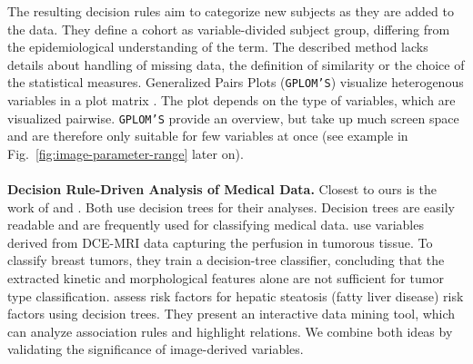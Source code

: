 \documentclass[a4paper,twoside]{style/article}
\begin{document}
The resulting decision rules aim to categorize new subjects as they are added to the data.
They define a cohort as variable-divided subject group, differing from the epidemiological understanding of the term.
The described method lacks details about handling of missing data, the definition of similarity or the choice of the statistical measures.
Generalized Pairs Plots (\texttt{GPLOM'S}) visualize heterogenous variables in a plot matrix \cite{GPLOMS}. %
The plot depends on the type of variables, which are visualized pairwise.
\texttt{GPLOM'S} provide an overview, but take up much screen space and are therefore only suitable for few variables at once (see example in Fig.~\ref{fig:image-parameter-range} later on).
\\\\
\noindent \textbf{Decision Rule-Driven Analysis of Medical Data.}
Closest to ours is the work of \cite{Glasser2013} and \cite{Niemann2014}.
Both use decision trees for their analyses.
Decision trees are easily readable and are frequently used for classifying medical data.
\cite{Glasser2013} use variables derived from DCE-MRI data capturing the perfusion in tumorous tissue.
To classify breast tumors, they train a decision-tree classifier, concluding that the extracted kinetic and morphological features alone are not sufficient for tumor type classification.
\cite{Niemann2014} assess risk factors for hepatic steatosis (fatty liver disease) risk factors using decision trees.
They present an interactive data mining tool, which can analyze association rules and highlight relations. %
We combine both ideas by validating the significance of image-derived variables.
\end{document}
